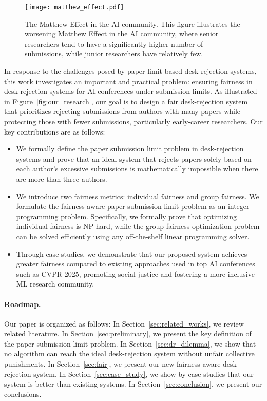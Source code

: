 \begin{figure}[!ht]
    \centering
    \texttt{[image: matthew\_effect.pdf]}
    \caption{
    The Matthew Effect in the AI community. This figure illustrates the worsening Matthew Effect in the AI community, where senior researchers tend to have a significantly higher number of submissions, while junior researchers have relatively few. 
    }
    \label{fig:matthew_effect}
\end{figure}

In response to the challenges posed by paper-limit-based desk-rejection systems, this work investigates an important and practical problem: ensuring fairness in desk-rejection systems for AI conferences under submission limits. As illustrated in Figure~\ref{fig:our_research}, our goal is to design a fair desk-rejection system that prioritizes rejecting submissions from authors with many papers while protecting those with fewer submissions, particularly early-career researchers. Our key contributions are as follows:

\begin{itemize}
\item We formally define the paper submission limit problem in desk-rejection systems and prove that an ideal system that rejects papers solely based on each author's excessive submissions is mathematically impossible when there are more than three authors.
\item We introduce two fairness metrics: individual fairness and group fairness. We formulate the fairness-aware paper submission limit problem as an integer programming problem. Specifically, we formally prove that optimizing individual fairness is NP-hard, while the group fairness optimization problem can be solved efficiently using any off-the-shelf linear programming solver.
\item Through case studies, we demonstrate that our proposed system achieves greater fairness compared to existing approaches used in top AI conferences such as CVPR 2025, promoting social justice and fostering a more inclusive ML research community.
\end{itemize}

\paragraph{Roadmap.} Our paper is organized as follows: In Section~\ref{sec:related_works}, we review related literature. In Section~\ref{sec:preliminary}, we present the key definition of the paper submission limit problem. In Section~\ref{sec:dr_dilemma}, we show that no algorithm can reach the ideal desk-rejection system without unfair collective punishments. In Section~\ref{sec:fair}, we present our new fairness-aware desk-rejection system. In Section~\ref{sec:case_study}, we show by case studies that our system is better than existing systems. In Section~\ref{sec:conclusion}, we present our conclusions. 


